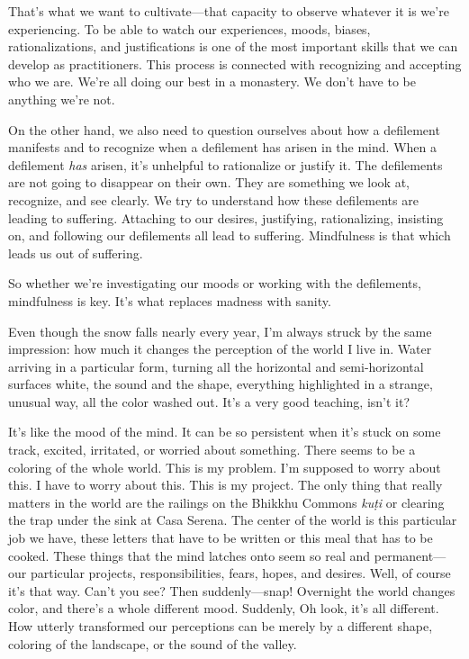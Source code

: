 That's what we want to cultivate---that capacity to observe whatever it 
is we're experiencing. To be able to watch our experiences, moods, 
biases, rationalizations, and justifications is one of the most 
important skills that we can develop as practitioners. This process is 
connected with recognizing and accepting who we are. We're all doing 
our best in a monastery. We don't have to be anything we're not.

On the other hand, we also need to question ourselves about how a 
defilement manifests and to recognize when a defilement has arisen in 
the mind. When a defilement \emph{has} arisen, it's unhelpful to 
rationalize or justify it. The defilements are not going to disappear 
on their own. They are something we look at, recognize, and see 
clearly. We try to understand how these defilements are leading to 
suffering. Attaching to our desires, justifying, rationalizing, 
insisting on, and following our defilements all lead to suffering. 
Mindfulness is that which leads us out of suffering.

So whether we're investigating our moods or working with the 
defilements, mindfulness is key. It's what replaces madness with sanity.


Even though the snow falls nearly every year, I'm always struck by the 
same impression: how much it changes the perception of the world I live 
in. Water arriving in a particular form, turning all the horizontal and 
semi-horizontal surfaces white, the sound and the shape, everything 
highlighted in a strange, unusual way, all the color washed out. It's a 
very good teaching, isn't it?

It's like the mood of the mind. It can be so persistent when it's stuck 
on some track, excited, irritated, or worried about something. There 
seems to be a coloring of the whole world. This is my problem. I'm 
supposed to worry about this. I have to worry about this. This is my 
project. The only thing that really matters in the world are the 
railings on the Bhikkhu Commons \emph{kuṭi} or clearing the trap 
under the sink at Casa Serena. The center of the world is this 
particular job we have, these letters that have to be written or this 
meal that has to be cooked. These things that the mind latches onto 
seem so real and permanent---our particular projects, responsibilities, 
fears, hopes, and desires. Well, of course it's that way. Can't you 
see? Then suddenly---snap! Overnight the world changes color, and 
there's a whole different mood. Suddenly, Oh look, it's all different. 
How utterly transformed our perceptions can be merely by a different 
shape, coloring of the landscape, or the sound of the valley.

